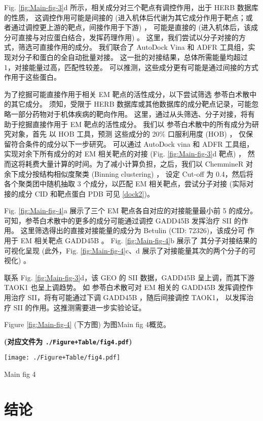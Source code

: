 \documentclass[
]{article}
\begin{document}
Fig. \ref{fig:Main-fig-3}d 所示，相关成分对三个靶点有调控作用，出于 HERB 数据库的性质，
这调控作用可能是间接的 (进入机体后代谢为其它成分作用于靶点；或者通过调控更上游的靶点，间接作用于下游) ，
可能是直接的 (进入机体后，该成分可直接与对应蛋白结合，发挥药理作用) 。
这里，我们尝试以分子对接的方式，筛选可直接作用的成分。
我们联合了 AutoDock Vina 和 ADFR 工具组，实现对分子和蛋白的全自动批量对接。
这一批的对接结果，总体所需能量均超过 1，对接能量过高，匹配性较差。
可以推测，这些成分更有可能是通过间接的方式作用于这些蛋白。

为了挖掘可能直接作用于相关 EM 靶点的活性成分，以下尝试筛选 参苓白术散中的其它成分。
须知，受限于 HERB 数据库或其他数据库的成分靶点记录，可能忽略一部分药物对于机体疾病的靶向作用。
这里，通过从头筛选、分子对接，将有助于挖掘直接作用于 EM 靶点的活性成分。
我们以 参苓白术散中的所有成分为研究对象，首先 以 HOB 工具，预测 这些成分的 20\% 口服利用度 (HOB) ，
仅保留符合条件的成分以下一步研究。
可以通过 AutoDock vina 和 ADFR 工具组，实现对余下所有成分的对 EM 相关靶点的对接 (Fig. \ref{fig:Main-fig-3}d 靶点) ，
然而这将耗费大量计算的时间。为了减小计算负担，之后，我们以 ChemmineR 对 余下成分按结构相似度聚类 (Binning clustering) ，
设定 Cut-off 为 0.4，然后将各个聚类团中随机抽取 3 个成分，以匹配 EM 相关靶点，尝试分子对接
(实际对接的成分 CID 和靶点蛋白 PDB 可见 \ref{dock2})。

Fig. \ref{fig:Main-fig-4}a 展示了三个 EM 靶点各自对应的对接能量最小前 5 的成分。
可知，参苓白术散中的更多的成分可能通过调控 GADD45B 发挥治疗 SII 的作用。
这里筛选得出的直接对接能量的成分为 Betulin (CID: 72326)，该成分可 作用于 EM 相关靶点 GADD45B 。
Fig. \ref{fig:Main-fig-4}b 展示了 其分子对接结果的可视化呈现 (此外，Fig. \ref{fig:Main-fig-4}c、d
展示了对接能量其次的两个分子的可视化) 。

联系 Fig. \ref{fig:Main-fig-3}d，该 GEO 的 SII 数据，GADD45B 呈上调，而其下游 TAOK1 也呈上调趋势。
如 参苓白术散可对 EM 相关的 GADD45B 发挥调控作用治疗 SII，将有可能通过下调 GADD45B ，随后间接调控 TAOK1，
以发挥治疗 SII 的作用。这推测需要进一步实验论证。

Figure \ref{fig:Main-fig-4} (下方图) 为图Main fig 4概览。

\textbf{(对应文件为 \texttt{./Figure+Table/fig4.pdf})}

\def\@captype{figure}
\begin{center}
\texttt{[image: ./Figure+Table/fig4.pdf]}
\caption{Main fig 4}\label{fig:Main-fig-4}
\end{center}

\hypertarget{dis}{%
\section{结论}\label{dis}}
\end{document}
